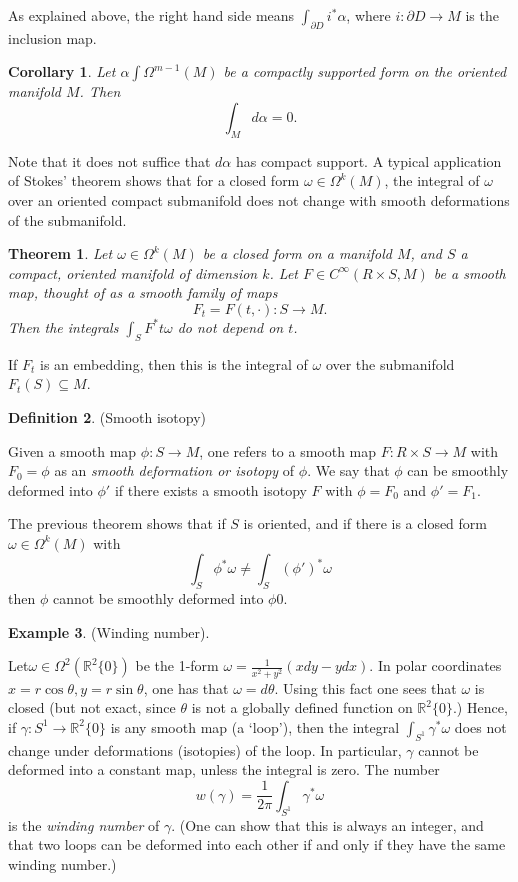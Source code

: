 \documentclass{article}
\newtheorem{theorem}{Theorem}[section]
\newtheorem{corollary}{Corollary}[theorem]
\theoremstyle{definition}
\newtheorem{defn}[theorem]{Definition}
\newtheorem{example}[theorem]{Example}
\newenvironment{definition}
  {\vspace{8pt}\begin{mdframed}[backgroundcolor=blueish]\begin{defn}}
  {\end{defn}\end{mdframed}\vspace{4pt}}
\begin{document}
As explained above, the right hand side means $\int_{\partial D} i^* \alpha $, where $i : \partial D \rightarrow M$ is the inclusion map.

\begin{corollary}
Let $\alpha \int \Omega^{m-1}(M)$ be a compactly supported form on the oriented manifold $M$. Then
\[ 
    \int_M d\alpha = 0.
\]
\end{corollary}

Note that it does not suffice that $d\alpha$ has compact support. A typical application of Stokes’ theorem shows that for a closed form $\omega \in \Omega^k (M)$, the integral of $\omega$ over an oriented compact submanifold does not change with smooth deformations of the submanifold.

\begin{theorem}

Let $\omega \in \Omega^k (M)$ be a closed form on a manifold $M$, and $S$ a compact, oriented manifold of dimension $k$. Let $F \in C^\infty(R\times S,M)$ be a smooth map, thought of as a smooth family of maps 
\[
F_t = F(t, \cdot) : S \rightarrow M.
\]
Then the integrals $\int_S F^* t \omega$ do not depend on $t$.
\end{theorem}

If $F_t$ is an embedding, then this is the integral of $\omega$ over the submanifold $F_t(S) \subseteq M$.

\begin{definition} (Smooth isotopy)

Given a smooth map $\phi : S \rightarrow M$, one refers to a smooth map $F : R \times S \rightarrow M$ with $F_0 = \phi $ as an \textit{smooth deformation or isotopy} of $\phi$. We say that $\phi$ can be smoothly deformed into $\phi'$ if there exists a smooth isotopy $F$ with $\phi = F_0$ and $\phi' = F_1$. 
\end{definition}

The previous theorem shows that if $S$ is oriented, and if there is a closed form $\omega \in \Omega^k (M)$ with
\[
 \int_S \phi^* \omega \neq \int_S (\phi' )^* \omega 
\]
then $\phi$ cannot be smoothly deformed into $\phi 0$.


\begin{example} (Winding number). 

Let$ \omega \in \Omega^2 (\mathbb R^2\{0\})$ be the 1-form $\omega = \frac{1}{x^2 +y^2} (xdy-ydx)$. In polar coordinates $x = r \cos\theta, y = r\sin\theta$, one has that $\omega = d\theta$. Using this fact one sees that $\omega$ is closed (but not exact, since $\theta$ is not a globally defined function on $\mathbb R^2\{0\}$.) Hence, if $\gamma : S^1 \rightarrow \mathbb R^2 \{0\}$ is any smooth map (a ‘loop’), then the integral $\int_{S^1} \gamma^*\omega$ does not change under deformations (isotopies) of the loop. In particular, $\gamma$ cannot be deformed into a constant map, unless the integral is zero. The number 
\[ 
    w(\gamma) = \frac{1}{2\pi} \int_{S^1} \gamma^*\omega
\]
is the \textit{winding number} of $\gamma$. (One can show that this is always an integer, and that two loops can be deformed into each other if and only if they have the same winding number.)

\end{example}
\end{document}
